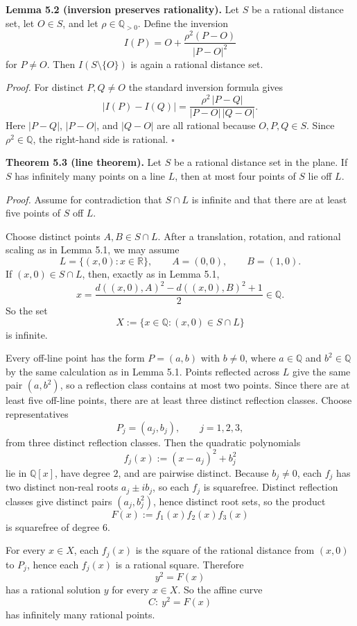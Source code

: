 \medskip
\noindent\textbf{Lemma 5.2 (inversion preserves rationality).}
Let $S$ be a rational distance set, let $O\in S$, and let $\rho\in \mathbb{Q}_{>0}$. Define the inversion
\[
I(P)=O+\frac{\rho^2(P-O)}{|P-O|^2}
\]
for $P\neq O$. Then $I(S\setminus\{O\})$ is again a rational distance set.

\smallskip
\noindent\emph{Proof.}
For distinct $P,Q\neq O$ the standard inversion formula gives
\[
|I(P)-I(Q)|=\frac{\rho^2\,|P-Q|}{|P-O|\,|Q-O|}.
\]
Here $|P-Q|$, $|P-O|$, and $|Q-O|$ are all rational because $O,P,Q\in S$. Since $\rho^2\in \mathbb{Q}$, the right-hand side is rational.
\hfill$\square$

\medskip
\noindent\textbf{Theorem 5.3 (line theorem).}
Let $S$ be a rational distance set in the plane. If $S$ has infinitely many points on a line $L$, then at most four points of $S$ lie off $L$.

\smallskip
\noindent\emph{Proof.}
Assume for contradiction that $S\cap L$ is infinite and that there are at least five points of $S$ off $L$.

Choose distinct points $A,B\in S\cap L$. After a translation, rotation, and rational scaling as in Lemma 5.1, we may assume
\[
L=\{(x,0):x\in \mathbb{R}\},\qquad A=(0,0),\qquad B=(1,0).
\]
If $(x,0)\in S\cap L$, then, exactly as in Lemma 5.1,
\[
x=\frac{d((x,0),A)^2-d((x,0),B)^2+1}{2}\in \mathbb{Q}.
\]
So the set
\[
X:=\{x\in \mathbb{Q} : (x,0)\in S\cap L\}
\]
is infinite.

Every off-line point has the form $P=(a,b)$ with $b\neq 0$, where $a\in \mathbb{Q}$ and $b^2\in \mathbb{Q}$ by the same calculation as in Lemma 5.1. Points reflected across $L$ give the same pair $(a,b^2)$, so a reflection class contains at most two points. Since there are at least five off-line points, there are at least three distinct reflection classes. Choose representatives
\[
P_j=(a_j,b_j),\qquad j=1,2,3,
\]
from three distinct reflection classes. Then the quadratic polynomials
\[
f_j(x):=(x-a_j)^2+b_j^2
\]
lie in $\mathbb{Q}[x]$, have degree $2$, and are pairwise distinct. Because $b_j\neq 0$, each $f_j$ has two distinct non-real roots $a_j\pm i b_j$, so each $f_j$ is squarefree. Distinct reflection classes give distinct pairs $(a_j,b_j^2)$, hence distinct root sets, so the product
\[
F(x):=f_1(x)f_2(x)f_3(x)
\]
is squarefree of degree $6$.

For every $x\in X$, each $f_j(x)$ is the square of the rational distance from $(x,0)$ to $P_j$, hence each $f_j(x)$ is a rational square. Therefore
\[
y^2=F(x)
\]
has a rational solution $y$ for every $x\in X$. So the affine curve
\[
C:\ y^2=F(x)
\]
has infinitely many rational points.

